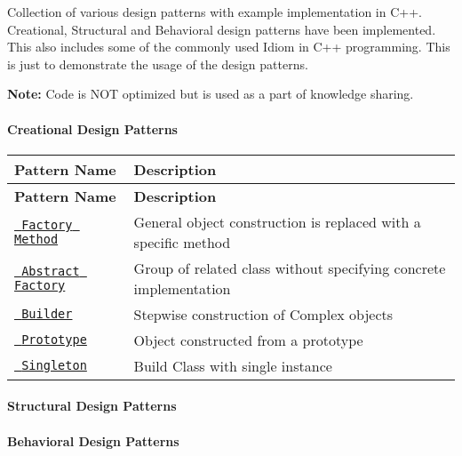 Collection of various design patterns with example implementation in C++. Creational, Structural and Behavioral design patterns have been implemented. This also includes some of the commonly used Idiom in C++ programming. This is just to demonstrate the usage of the design patterns.

{\bfseries{Note\+:}} Code is N\+OT optimized but is used as a part of knowledge sharing.

\paragraph*{Creational Design Patterns}

\tabulinesep=1mm
\begin{longtabu}spread 0pt [c]{*{2}{|X[-1]}|}
\hline
\cellcolor{\tableheadbgcolor}\textbf{ Pattern Name  }&\cellcolor{\tableheadbgcolor}\textbf{ Description   }\\
\endfirsthead
\hline
\endfoot
\hline
\cellcolor{\tableheadbgcolor}\textbf{ Pattern Name  }&\cellcolor{\tableheadbgcolor}\textbf{ Description   }\\
\endhead
\href{https://github.com/jayavardhanravi/DesignPatterns/tree/master/FactoryMethod}{\texttt{ Factory Method}}  &General object construction is replaced with a specific method   \\
\href{https://github.com/jayavardhanravi/DesignPatterns/tree/master/AbstractFactory}{\texttt{ Abstract Factory}}  &Group of related class without specifying concrete implementation   \\
\href{https://github.com/jayavardhanravi/DesignPatterns/tree/master/Builder}{\texttt{ Builder}}  &Stepwise construction of Complex objects   \\
\href{https://github.com/jayavardhanravi/DesignPatterns/tree/master/Prototype}{\texttt{ Prototype}}  &Object constructed from a prototype   \\
\href{https://github.com/jayavardhanravi/DesignPatterns/tree/master/Singleton}{\texttt{ Singleton}}  &Build Class with single instance   \\
\end{longtabu}


\paragraph*{Structural Design Patterns}


\begin{DoxyItemize}
\item \paragraph*{Behavioral Design Patterns}
\end{DoxyItemize}


